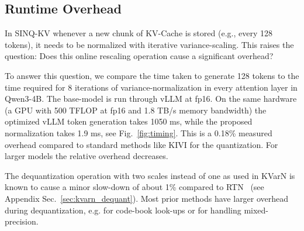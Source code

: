 \documentclass{llmxive}
\providecommand{\methodname}{SINQ-KV\xspace}
\begin{document}

\subsection{Runtime Overhead}
In \methodname whenever a new chunk of KV-Cache is stored (e.g., every 128 tokens), it needs to be normalized with iterative variance-scaling. This raises the question: Does this online rescaling operation cause a significant overhead?

To answer this question, we compare the time taken to generate 128 tokens to the time required for 8 iterations of variance-normalization in every attention layer in Qwen3-4B. The base-model is run through vLLM \cite{kwon2023efficientvLLM} at fp16. On the same hardware (a GPU with 500 TFLOP at fp16 and 1.8 TB/s memory bandwidth) the optimized vLLM token generation takes 1050 ms, while the proposed normalization takes 1.9 ms, see Fig.~\ref{fig:timing}. This is a 0.18\% measured overhead compared to standard methods like KIVI \cite{KIVI} for the quantization. For larger models the relative overhead decreases. 

The dequantization operation with two scales instead of one as used in KVarN is known to cause a minor slow-down of about 1\% compared to RTN~\cite{muller2025sinq} (see Appendix Sec.~\ref{sec:kvarn_dequant}). Most prior methods have larger overhead during dequantization, e.g. for code-book look-ups or for handling mixed-precision. 



\end{document}
